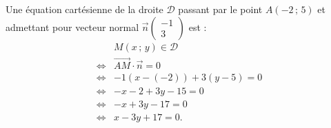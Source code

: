 \documentclass[10pt]{article}
\begin{document}
Une équation cartésienne de la droite \(\mathcal{D}\) passant par le point \(A(-2\,;\,5)\) et admettant pour vecteur normal \(\vec{n} \begin{pmatrix} -1 \\ 3 \end{pmatrix}\) est :
\begin{align*}
&M(x\,;\,y) \in \mathcal{D} \\
\iff &\overrightarrow{AM} \cdot \vec{n} = 0 \\
\iff &-1(x - (-2)) + 3(y - 5) = 0 \\
\iff &-x - 2 + 3y - 15 = 0 \\
\iff &-x + 3y - 17 = 0 \\
\iff &x - 3y + 17 = 0.
\end{align*}
\end{document}
